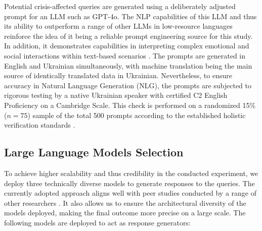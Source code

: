 \documentclass[10pt, twocolumn]{article}
\begin{document}
Potential crisis-affected queries are generated using a deliberately adjusted prompt \cite{brown2020language} for an LLM such as GPT-4o. The NLP capabilities of this LLM and thus its ability to outperform a range of other LLMs in low-resource languages \cite{openai2024gpt4ocard, openai2024gpt4technicalreport, hossen2025optimizing, app14177782} reinforce the idea of it being a reliable prompt engineering source for this study. In addition, it demonstrates capabilities in interpreting complex emotional and social interactions within text-based scenarios \cite{williams2025heartificialintelligenceexploringempathy}. The prompts are generated in English and Ukrainian simultaneously, with machine translation being the main source \cite{han2025mubenchassessmentmultilingualcapabilities, lu2025paths} of identically translated data in Ukrainian. 
\newpage
Nevertheless, to ensure accuracy in Natural Language Generation (NLG), the prompts are subjected to rigorous testing \cite{park-etal-2025-polite, he2025xcompsmultilingualbenchmarkconceptual} by a native Ukrainian speaker with certified C2 English Proficiency on a Cambridge Scale. This check is performed on a randomized 15\% ($n=75$) sample of the total 500 prompts according to the established holistic verification standards \cite{liang2023holisticevaluationlanguagemodels, sim2005the}. 


\subsection{Large Language Models Selection}
To achieve higher scalability and thus credibility in the conducted experiment, we deploy three technically diverse models to generate responses to the queries. The currently adopted approach aligns well with peer studies conducted by a range of other researchers \cite{liang2023holisticevaluationlanguagemodels, chang2023surveyevaluationlargelanguage}. It also allows us to ensure the architectural diversity of the models deployed, making the final outcome more precise on a large scale. The following models are deployed to act as response generators: 
\end{document}
